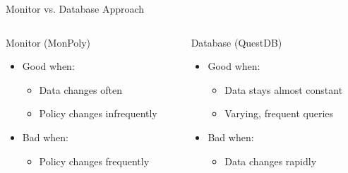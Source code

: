 \begin{frame}{Monitor vs. Database Approach}
    \begin{columns}
        \begin{column}{0.5\textwidth}
            {\Large Monitor (MonPoly)}
            \begin{itemize}
                \item Good when: 
                    \begin{itemize}
                        \item Data changes often
                        \item Policy changes infrequently
                    \end{itemize}
                \item Bad when:
                    \begin{itemize}
                        \item Policy changes frequently
                    \end{itemize}
            \end{itemize}

        \end{column}
        \begin{column}{0.5\textwidth}
            {\Large Database (QuestDB)}
            \begin{itemize}
                \item Good when:
                    \begin{itemize}
                        \item Data stays almost constant
                        \item Varying, frequent queries
                    \end{itemize}

                \item Bad when:
                    \begin{itemize}
                        \item Data changes rapidly
                    \end{itemize}
            \end{itemize}


        \end{column}
    \end{columns}
    
\end{frame}


